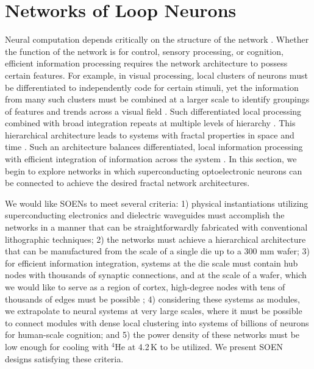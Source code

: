 \documentclass[twocolumn]{article}
\begin{document}
\section{\label{sec:networks}Networks of Loop Neurons}
Neural computation depends critically on the structure of the network \cite{spto2000}. Whether the function of the network is for control, sensory processing, or cognition, efficient information processing requires the network architecture to possess certain features. For example, in visual processing, local clusters of neurons must be differentiated to independently code for certain stimuli, yet the information from many such clusters must be combined at a larger scale to identify groupings of features and trends across a visual field \cite{haah2017}. Such differentiated local processing combined with broad integration repeats at multiple levels of hierarchy \cite{stsa2000,budr2004}. This hierarchical architecture leads to systems with fractal properties in space and time \cite{bu2006,busp2009}. Such an architecture balances differentiated, local information processing with efficient integration of information across the system \cite{to2004}. In this section, we begin to explore networks in which superconducting optoelectronic neurons can be connected to achieve the desired fractal network architectures.

We would like SOENs to meet several criteria: 1) physical instantiations utilizing superconducting electronics and dielectric waveguides must accomplish the networks in a manner that can be straightforwardly fabricated with conventional lithographic techniques; 2) the networks must achieve a hierarchical architecture that can be manufactured from the scale of a single die up to a 300 mm wafer; 3) for efficient information integration, systems at the die scale must contain hub nodes with thousands of synaptic connections, and at the scale of a wafer, which we would like to serve as a region of cortex, high-degree nodes with tens of thousands of edges must be possible \cite{shICRC2018}; 4) considering these systems as modules, we extrapolate to neural systems at very large scales, where it must be possible to connect modules with dense local clustering into systems of billions of neurons for human-scale cognition; and 5) the power density of these networks must be low enough for cooling with $^4$He at 4.2\,K to be utilized. We present SOEN designs satisfying these criteria.
	
\end{document}
